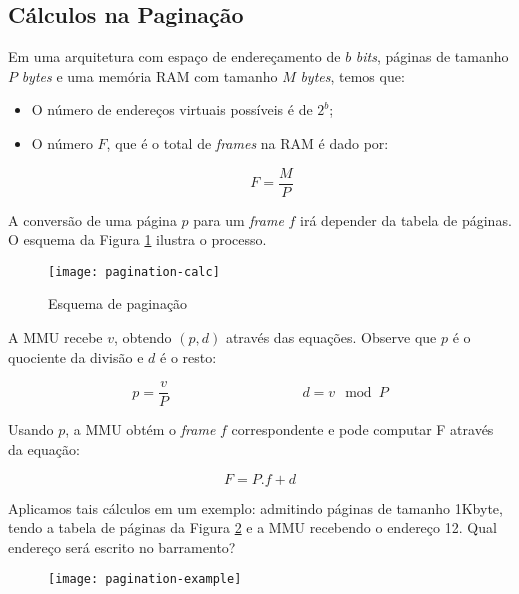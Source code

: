 \subsection{Cálculos na Paginação}
Em uma arquitetura com espaço de endereçamento de $b$ \textit{bits}, páginas de tamanho $P$ \textit{bytes} e uma memória RAM com tamanho $M$ \textit{bytes}, temos que:

\begin{itemize}
  \item O número de endereços virtuais possíveis é de $2^b$;

  \item O número $F$, que é o total de \textit{frames} na RAM é dado por:

  \begin{equation*}
    F = \frac{M}{P}
  \end{equation*}
\end{itemize}

A conversão de uma página $p$ para um \textit{frame} $f$ irá depender da tabela de páginas. O esquema da Figura \ref{fig:pagination-calc} ilustra o processo.

\begin{figure}[H]
  \centering
  \texttt{[image: pagination-calc]}
  \caption{Esquema de paginação}
  \label{fig:pagination-calc}
\end{figure}

A MMU recebe $v$, obtendo $(p,d)$ através das equações. Observe que $p$ é o quociente da divisão e $d$ é o resto:

\begin{equation*}
  p = \frac{v}{P} \hspace{4cm} d = v\mod P
\end{equation*}

Usando $p$, a MMU obtém o \textit{frame} $f$ correspondente e pode computar F através da equação:

\begin{equation*}
  F = P . f + d
\end{equation*}

Aplicamos tais cálculos em um exemplo: admitindo páginas de tamanho 1Kbyte, tendo a tabela de páginas da Figura \ref{fig:pagination-example} e a MMU recebendo o endereço 12. Qual endereço será escrito no barramento?

\begin{figure}[H]
  \centering
  \texttt{[image: pagination-example]}
  \label{fig:pagination-example}
\end{figure}

